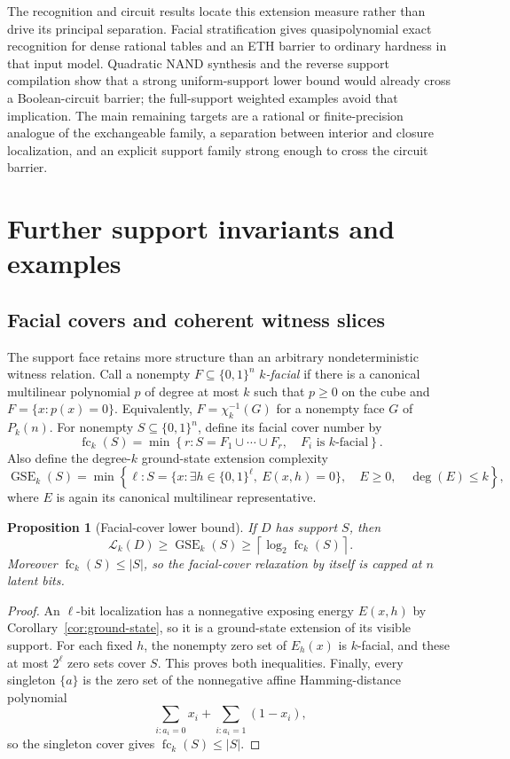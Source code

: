 \documentclass{article}
\newcommand{\LC}{\mathcal{L}}
\newcommand{\GSE}{\operatorname{GSE}}
\newcommand{\fc}{\operatorname{fc}}
\newcommand{\bits}{\{0,1\}}
\newtheorem{proposition}{Proposition}
\begin{document}
The recognition and circuit results locate this extension measure rather than
drive its principal separation.  Facial stratification gives
quasipolynomial exact recognition for dense rational tables and an ETH barrier
to ordinary hardness in that input model.  Quadratic NAND synthesis and the
reverse support compilation show that a strong uniform-support lower bound
would already cross a Boolean-circuit barrier; the full-support weighted
examples avoid that implication.  The main remaining targets are a rational
or finite-precision analogue of the exchangeable family, a separation between
interior and closure localization, and an explicit support family strong
enough to cross the circuit barrier.

\appendix

\section{Further support invariants and examples}
\label{app:support-invariants}

\subsection{Facial covers and coherent witness slices}
\label{sec:support-invariants}

The support face retains more structure than an arbitrary nondeterministic
witness relation.  Call a nonempty $F\subseteq\bits^n$ \emph{$k$-facial} if
there is a canonical multilinear polynomial $p$ of degree at most $k$ such
that $p\ge0$ on the cube and $F=\{x:p(x)=0\}$.  Equivalently,
$F=\chi_k^{-1}(G)$ for a nonempty face $G$ of $P_k(n)$.  For nonempty
$S\subseteq\bits^n$, define its facial cover number by
\[
  \fc_k(S)=\min\left\{r:S=F_1\cup\cdots\cup F_r,
  \quad F_i\text{ is $k$-facial}\right\}.
\]
Also define the degree-$k$ ground-state extension complexity
\[
  \GSE_k(S)=\min\left\{\ell:
  S=\{x:\exists h\in\bits^\ell,\ E(x,h)=0\},\quad
  E\ge0,\quad\deg(E)\le k\right\},
\]
where $E$ is again its canonical multilinear representative.

\begin{proposition}[Facial-cover lower bound]
\label{prop:facial-cover}
If $D$ has support $S$, then
\[
  \LC_k(D)\ge\GSE_k(S)
  \ge\left\lceil\log_2\fc_k(S)\right\rceil.
\]
Moreover $\fc_k(S)\le|S|$, so the facial-cover relaxation by itself is capped
at $n$ latent bits.
\end{proposition}

\begin{proof}
An $\ell$-bit localization has a nonnegative exposing energy $E(x,h)$ by
Corollary~\ref{cor:ground-state}, so it is a ground-state extension of its
visible support.  For each fixed $h$, the nonempty zero set of $E_h(x)$ is
$k$-facial, and these at most $2^\ell$ zero sets cover $S$.  This proves both
inequalities.  Finally, every singleton $\{a\}$ is the zero set of the
nonnegative affine Hamming-distance polynomial
\[
  \sum_{i:a_i=0}x_i+\sum_{i:a_i=1}(1-x_i),
\]
so the singleton cover gives $\fc_k(S)\le|S|$.
\end{proof}
\end{document}
